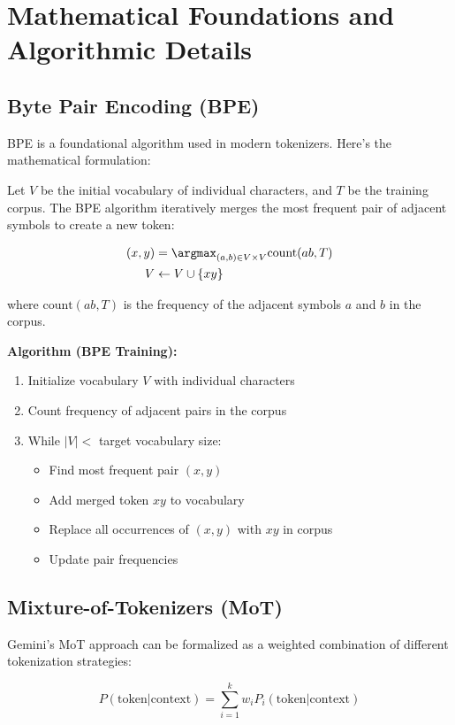 \documentclass{article}
\begin{document}
\section{Mathematical Foundations and Algorithmic Details}

\subsection{Byte Pair Encoding (BPE)}
BPE is a foundational algorithm used in modern tokenizers. Here's the mathematical formulation:

Let $V$ be the initial vocabulary of individual characters, and $T$ be the training corpus. The BPE algorithm iteratively merges the most frequent pair of adjacent symbols to create a new token:

\begin{align*}
(x, y) &= \argmax_{(a,b) \in V \times V} \text{count}(ab, T) \\
V &\leftarrow V \cup \{xy\}
\end{align*}

where $\text{count}(ab, T)$ is the frequency of the adjacent symbols $a$ and $b$ in the corpus.

\textbf{Algorithm (BPE Training):}
\begin{enumerate}
\item Initialize vocabulary $V$ with individual characters
\item Count frequency of adjacent pairs in the corpus
\item While $|V| < $ target vocabulary size:
   \begin{itemize}
   \item Find most frequent pair $(x,y)$
   \item Add merged token $xy$ to vocabulary
   \item Replace all occurrences of $(x,y)$ with $xy$ in corpus
   \item Update pair frequencies
   \end{itemize}
\end{enumerate}

\subsection{Mixture-of-Tokenizers (MoT)}
Gemini's MoT approach can be formalized as a weighted combination of different tokenization strategies:

\begin{equation*}
P(\text{token}|\text{context}) = \sum_{i=1}^{k} w_i P_i(\text{token}|\text{context})
\end{equation*}
\end{document}
